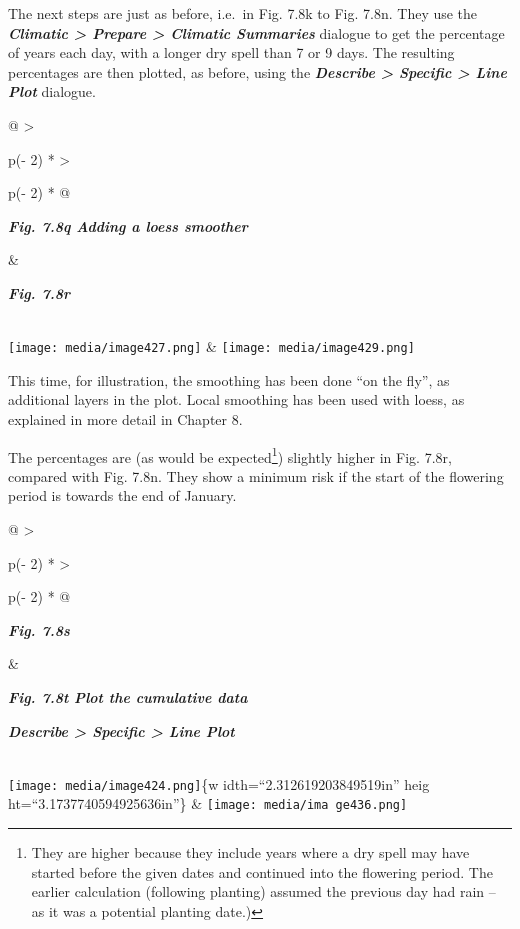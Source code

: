 \documentclass[
  letterpaper,
  DIV=11,
  numbers=noendperiod]{scrreprt}
\begin{document}
The next steps are just as before, i.e.~in Fig. 7.8k to Fig. 7.8n. They
use the \textbf{\emph{Climatic \textgreater{} Prepare \textgreater{}
Climatic Summaries}} dialogue to get the percentage of years each day,
with a longer dry spell than 7 or 9 days. The resulting percentages are
then plotted, as before, using the \textbf{\emph{Describe \textgreater{}
Specific \textgreater{} Line Plot}} dialogue.

\begin{longtable}[]{@{}
  >{\raggedright\arraybackslash}p{(\columnwidth - 2\tabcolsep) * }
  >{\raggedright\arraybackslash}p{(\columnwidth - 2\tabcolsep) * }@{}}
\toprule\noalign{}
\begin{minipage}[b]{\linewidth}\raggedright
\textbf{\emph{Fig. 7.8q Adding a loess smoother}}
\end{minipage} & \begin{minipage}[b]{\linewidth}\raggedright
\textbf{\emph{Fig. 7.8r}}
\end{minipage} \\
\midrule\noalign{}
\endhead
\bottomrule\noalign{}
\endlastfoot
\texttt{[image: media/image427.png]} &
\texttt{[image: media/image429.png]} \\
\end{longtable}

This time, for illustration, the smoothing has been done ``on the fly'',
as additional layers in the plot. Local smoothing has been used with
loess, as explained in more detail in Chapter 8.

The percentages are (as would be expected\footnote{They are higher
  because they include years where a dry spell may have started before
  the given dates and continued into the flowering period. The earlier
  calculation (following planting) assumed the previous day had rain --
  as it was a potential planting date.)}) slightly higher in Fig. 7.8r,
compared with Fig. 7.8n. They show a minimum risk if the start of the
flowering period is towards the end of January.

\begin{longtable}[]{@{}
  >{\raggedright\arraybackslash}p{(\columnwidth - 2\tabcolsep) * }
  >{\raggedright\arraybackslash}p{(\columnwidth - 2\tabcolsep) * }@{}}
\toprule\noalign{}
\begin{minipage}[b]{\linewidth}\raggedright
\textbf{\emph{Fig. 7.8s}}
\end{minipage} & \begin{minipage}[b]{\linewidth}\raggedright
\textbf{\emph{Fig. 7.8t Plot the cumulative data}}

\textbf{\emph{Describe \textgreater{} Specific \textgreater{} Line
Plot}}
\end{minipage} \\
\midrule\noalign{}
\endhead
\bottomrule\noalign{}
\endlastfoot
\texttt{[image: media/image424.png]}\{w idth=``2.312619203849519in''
heig ht=``3.1737740594925636in''\} &
\texttt{[image: media/ima ge436.png]} \\
\end{longtable}
\end{document}
